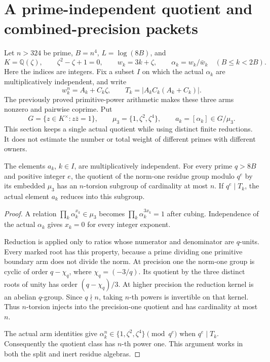 \section{A prime-independent quotient and combined-precision packets}
\label{sec-jp-packets}

Let \(n>324\) be prime, \(B=n^4\), \(L=\log(8B)\), and
\[
 K=\mathbb Q(\zeta),\qquad \zeta^2-\zeta+1=0,\qquad
 w_k=3k+\zeta,\qquad \alpha_k=w_k/\bar w_k
 \quad(B\le k<2B).
\]
Here the indices are integers. Fix a subset \(I\) on which the actual
\(\alpha_k\) are multiplicatively independent, and write
\[
 w_k^n=A_k+C_k\zeta,\qquad
 T_k=\lvert A_kC_k(A_k+C_k)\rvert .
\]
The previously proved primitive-power arithmetic makes these three arms
nonzero and pairwise coprime. Put
\[
 G=\{z\in K^\times:z\bar z=1\},\qquad
 \mu_3=\{1,\zeta^2,\zeta^4\},\qquad a_k=[\alpha_k]\in G/\mu_3.
\]
This section keeps a single actual quotient while using distinct finite
reductions. It does not estimate the number or total weight of different
primes with different owners.

\begin{lemma}
\label{jp-quotient}
The elements \(a_k\), \(k\in I\), are multiplicatively independent.
For every prime \(q>8B\) and positive integer \(e\), the quotient of the
norm-one residue group modulo \(q^e\) by its embedded \(\mu_3\) has an
\(n\)-torsion subgroup of cardinality at most \(n\).
If \(q^e\mid T_k\), the actual element \(a_k\) reduces into this subgroup.
\end{lemma}
\begin{proof}
A relation \(\prod_k\alpha_k^{x_k}\in\mu_3\) becomes
\(\prod_k\alpha_k^{3x_k}=1\) after cubing. Independence of the actual
\(\alpha_k\) gives \(x_k=0\) for every integer exponent.

Reduction is applied only to ratios whose numerator and denominator are
\(q\)-units. Every marked root has this property, because a prime dividing
one primitive boundary arm does not divide the norm. At precision one
the norm-one group is cyclic of order \(q-\chi_q\), where
\(\chi_q=(-3/q)\). Its quotient by the three distinct roots of unity has
order \((q-\chi_q)/3\). At higher precision the reduction kernel is an
abelian \(q\)-group. Since \(q\nmid n\), taking \(n\)-th powers is invertible
on that kernel. Thus \(n\)-torsion injects into the precision-one quotient
and has cardinality at most \(n\).

The actual arm identities give
\(\alpha_k^n\in\{1,\zeta^2,\zeta^4\}\pmod{q^e}\) when \(q^e\mid T_k\).
Consequently the quotient class has \(n\)-th power one. This argument
works in both the split and inert residue algebras.
\end{proof}

